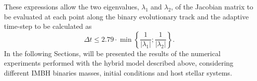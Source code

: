 \documentclass[12pt,twoside,openany]{book}
\begin{document}
These expressions allow the two eigenvalues, $\lambda_1$ and $\lambda_2$, of the Jacobian matrix to be evaluated at each point along the binary evolutionary track and the adaptive time-step to be calculated as
\begin{equation}
    \Delta t \le 2.79 \cdot \min\left\{
    \frac{1}{|\lambda_1|};
    \frac{1}{|\lambda_2|}
    \right\}.
\end{equation}
In the following Sections, will be presented the results of the numerical experiments performed with the hybrid model described above, considering different IMBH binaries masses, initial conditions and host stellar systems.
\end{document}
